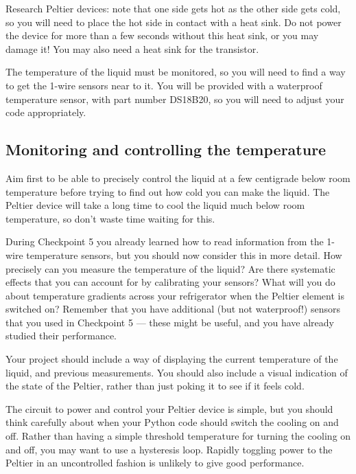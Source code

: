 Research Peltier devices: note that one side gets hot as the other side gets cold, so you will need to place the hot side in contact with a heat sink.
Do not power the device for more than a few seconds without this heat sink, or you may damage it!
You may also need a heat sink for the transistor.

The temperature of the liquid must be monitored, so you will need to find a way to get the 1-wire sensors near to it.
You will be provided with a waterproof temperature sensor, with part number DS18B20, so you will need to adjust your code appropriately.%

\subsection{Monitoring and controlling the temperature}

Aim first to be able to precisely control the liquid at a few centigrade below room temperature before trying to find out how cold you can make the liquid.
The Peltier device will take a long time to cool the liquid much below room temperature, so don't waste time waiting for this.

During Checkpoint 5 you already learned how to read information from the 1-wire temperature sensors, but you should now consider this in more detail.
How precisely can you measure the temperature of the liquid?
Are there systematic effects that you can account for by calibrating your sensors?
What will you do about temperature gradients across your refrigerator when the Peltier element is switched on?
Remember that you have additional (but not waterproof!) sensors that you used in Checkpoint 5 --- these might be useful, and you have already studied their performance.

Your project should include a way of displaying the current temperature of the liquid, and previous measurements.
You should also include a visual indication of the state of the Peltier, rather than just poking it to see if it feels cold.

The circuit to power and control your Peltier device is simple, but you should think carefully about when your Python code should switch the cooling on and off.
Rather than having a simple threshold temperature for turning the cooling on and off, you may want to use a hysteresis loop.
Rapidly toggling power to the Peltier in an uncontrolled fashion is unlikely to give good performance.

